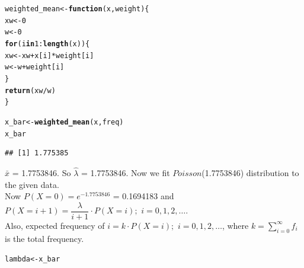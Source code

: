 \documentclass[11pt, a4paper]{article}\usepackage[]{graphicx}\usepackage[]{xcolor}
\makeatletter
\newcommand{\hlnum}[1]{\textcolor[rgb]{0.686,0.059,0.569}{#1}}%
\newcommand{\hlopt}[1]{\textcolor[rgb]{0,0,0}{#1}}%
\newcommand{\hldef}[1]{\textcolor[rgb]{0.345,0.345,0.345}{#1}}%
\newcommand{\hlkwa}[1]{\textcolor[rgb]{0.161,0.373,0.58}{\textbf{#1}}}%
\newcommand{\hlkwb}[1]{\textcolor[rgb]{0.69,0.353,0.396}{#1}}%
\newcommand{\hlkwc}[1]{\textcolor[rgb]{0.333,0.667,0.333}{#1}}%
\newcommand{\hlkwd}[1]{\textcolor[rgb]{0.737,0.353,0.396}{\textbf{#1}}}%
\newenvironment{kframe}{%
 \def\at@end@of@kframe{}%
 \ifinner\ifhmode%
  \def\at@end@of@kframe{\end{minipage}}%
  \begin{minipage}{\columnwidth}%
 \fi\fi%
 \def\FrameCommand##1{\hskip\@totalleftmargin \hskip-\fboxsep
 \colorbox{shadecolor}{##1}\hskip-\fboxsep
     \hskip-\linewidth \hskip-\@totalleftmargin \hskip\columnwidth}%
 \MakeFramed {\advance\hsize-\width
   \@totalleftmargin\z@ \linewidth\hsize
   \@setminipage}}%
 {\par\unskip\endMakeFramed%
 \at@end@of@kframe}
\newenvironment{knitrout}{}{} %
\makeatother
\begin{document}
\begin{knitrout}
\color{fgcolor}\begin{kframe}
\begin{alltt}
\hldef{weighted_mean} \hlkwb{<-} \hlkwa{function}\hldef{(}\hlkwc{x}\hldef{,} \hlkwc{weight}\hldef{)\{}
  \hldef{xw} \hlkwb{<-} \hlnum{0}
  \hldef{w} \hlkwb{<-} \hlnum{0}
  \hlkwa{for} \hldef{(i} \hlkwa{in} \hlnum{1}\hlopt{:}\hlkwd{length}\hldef{(x)) \{}
    \hldef{xw} \hlkwb{<-} \hldef{xw} \hlopt{+} \hldef{x[i]} \hlopt{*} \hldef{weight[i]}
    \hldef{w} \hlkwb{<-} \hldef{w} \hlopt{+} \hldef{weight[i]}
  \hldef{\}}
  \hlkwd{return}\hldef{(xw} \hlopt{/} \hldef{w)}
\hldef{\}}
\end{alltt}
\end{kframe}
\end{knitrout}

\begin{knitrout}
\color{fgcolor}\begin{kframe}
\begin{alltt}
\hldef{x_bar} \hlkwb{<-} \hlkwd{weighted_mean}\hldef{(x, freq)}
\hldef{x_bar}
\end{alltt}
\begin{verbatim}
## [1] 1.775385
\end{verbatim}
\end{kframe}
\end{knitrout}

$\bar{x}$ = 1.7753846. So $\hat{\lambda}$ = 1.7753846. Now we fit $Poisson$(1.7753846) distribution to the given data. \\

Now $P(X = 0) = e^{-1.7753846}$ = 0.1694183 and \\

$P(X = i + 1) = \dfrac{\lambda}{i + 1} \cdot P(X = i); \,\, i = 0,1,2,\ldots .$ \\

Also, expected frequency of $i = k \cdot P(X = i); \,\, i = 0,1,2,\ldots$, where $k = \sum \limits_{i = 0}^{\infty} f_i$ is the total frequency.

\begin{knitrout}\footnotesize
{}\color{fgcolor}\begin{kframe}
\begin{alltt}
\hldef{lambda} \hlkwb{<-} \hldef{x_bar}
\end{alltt}
\end{kframe}
\end{knitrout}
\end{document}
